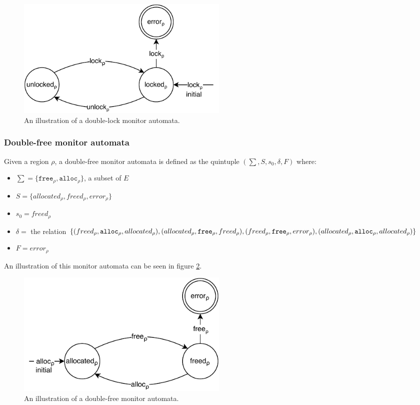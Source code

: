 \begin{figure}[H]
    \centering
    \includegraphics[width=0.5\textwidth]{background/figures/double-lock}
    \caption{An illustration of a double-lock monitor automata.}
    \label{double-lock-automata}
\end{figure}

\subsubsection{Double-free monitor automata}

Given a region $\rho$, a double-free monitor automata is defined as the quintuple $(\sum, S, s_0, \delta, F)$ where: 

\begin{itemize}
    \item $\sum = \{\texttt{free}_\rho, \texttt{alloc}_\rho\}$, a subset of $E$
    \item $S = \{ allocated_\rho, freed_\rho, error_\rho \}$
    \item $s_0 = freed_\rho$ 
    \item $\delta =$ the relation $\{(freed_\rho, \texttt{alloc}_\rho, allocated_\rho), (allocated_\rho, \texttt{free}_\rho, freed_\rho), \\
    (freed_\rho, \texttt{free}_\rho, error_\rho), (allocated_\rho, \texttt{alloc}_\rho, allocated_\rho)\}$ 
    \item $F = error_\rho$  
\end{itemize}

An illustration of this monitor automata can be seen in figure \ref{double-free-automata}. 

\begin{figure}[H]
    \centering
    \includegraphics[width=0.5\textwidth]{background/figures/double-free}
    \caption{An illustration of a double-free monitor automata.}
    \label{double-free-automata}
\end{figure}

